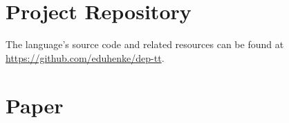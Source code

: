 \documentclass[
       embeddedlogo,
       english,
       lmodern,
       coorientadorbanca,
       noabntexcite
]{ufsc-thesis-rn46-2019}
\begin{document}
\listoffigures*
\tableofcontents*

\textual%






\postextual
\printbibliography{}

\apendices
\chapter{Project Repository}
\label{appendix:project-repository}

The language's source code and related resources can be found at \url{https://github.com/eduhenke/dep-tt}.

\chapter{Paper}

\end{document}
